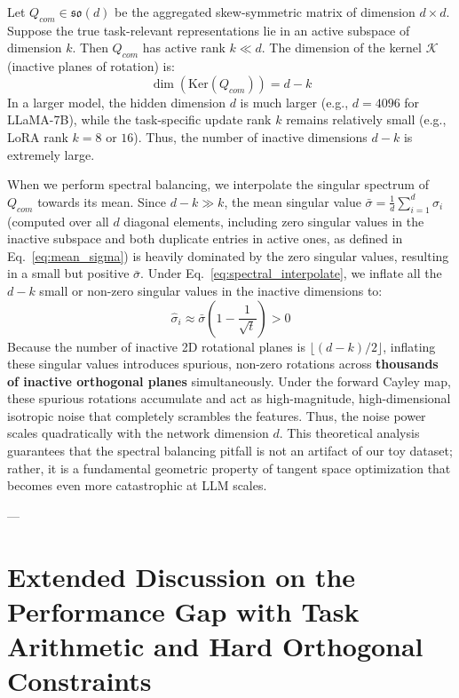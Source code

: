 Let $Q_{com} \in \mathfrak{so}(d)$ be the aggregated skew-symmetric matrix of dimension $d \times d$. Suppose the true task-relevant representations lie in an active subspace of dimension $k$. Then $Q_{com}$ has active rank $k \ll d$. The dimension of the kernel $\mathcal{K}$ (inactive planes of rotation) is:
\begin{equation}
\dim(\mathrm{Ker}(Q_{com})) = d - k
\end{equation}
In a larger model, the hidden dimension $d$ is much larger (e.g., $d = 4096$ for LLaMA-7B), while the task-specific update rank $k$ remains relatively small (e.g., LoRA rank $k = 8$ or $16$). Thus, the number of inactive dimensions $d-k$ is extremely large. 

When we perform spectral balancing, we interpolate the singular spectrum of $Q_{com}$ towards its mean. Since $d - k \gg k$, the mean singular value $\bar{\sigma} = \frac{1}{d} \sum_{i=1}^d \sigma_i$ (computed over all $d$ diagonal elements, including zero singular values in the inactive subspace and both duplicate entries in active ones, as defined in Eq.~\ref{eq:mean_sigma}) is heavily dominated by the zero singular values, resulting in a small but positive $\bar{\sigma}$. Under Eq.~\ref{eq:spectral_interpolate}, we inflate all the $d-k$ small or non-zero singular values in the inactive dimensions to:
\begin{equation}
\hat{\sigma}_i \approx \bar{\sigma} \left(1 - \frac{1}{\sqrt{t}}\right) > 0
\end{equation}
Because the number of inactive 2D rotational planes is $\lfloor (d-k)/2 \rfloor$, inflating these singular values introduces spurious, non-zero rotations across \textbf{thousands of inactive orthogonal planes} simultaneously. Under the forward Cayley map, these spurious rotations accumulate and act as high-magnitude, high-dimensional isotropic noise that completely scrambles the features. Thus, the noise power scales quadratically with the network dimension $d$. This theoretical analysis guarantees that the spectral balancing pitfall is not an artifact of our toy dataset; rather, it is a fundamental geometric property of tangent space optimization that becomes even more catastrophic at LLM scales.

---

\section{Extended Discussion on the Performance Gap with Task Arithmetic and Hard Orthogonal Constraints}
\label{sec:appendix_perf_gap}

